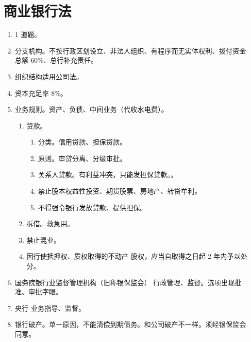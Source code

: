 \section{商业银行法}
\begin{enumerate}
  \item 1 道题。
  \item 分支机构。不按行政区划设立、非法人组织、有程序而无实体权利、拨付资金 \xydy 总额 60\%、总行补充责任。
  \item 组织结构适用公司法。
  \item 资本充足率 8\%。
  \item 业务规则。资产、负债、中间业务（代收水电费）。
        \begin{enumerate}
          \item 贷款。
                \begin{enumerate}
                  \item 分类。信用贷款、担保贷款。
                  \item 原则。审贷分离、分级审批。
                  \item 关系人贷款。有利益冲突，只能发担保贷款。。
                  \item 禁止股本权益性投资、期货股票、房地产、转贷牟利。
                  \item 不得强令银行发放贷款、提供担保。
                \end{enumerate}
          \item 拆借。救急用。
          \item 禁止混业。
          \item 因行使抵押权、质权取得的不动产 \hz 股权，应当自取得之日起 2 年内予以处分。
        \end{enumerate}
  \item 国务院银行业监督管理机构（旧称银保监会） \yjt 行政管理、监督。选项出现批准、审批字眼。
  \item 央行 \yjt 业务指导、监督。
  \item 银行破产。\yi 单一原因，不能清偿到期债务。和公司破产不一样。\er 须经银保监会同意。
\end{enumerate}
